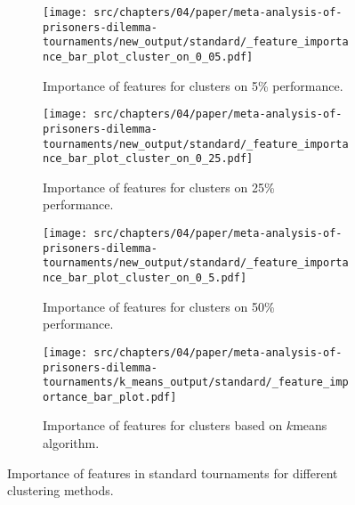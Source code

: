 \begin{figure}[!htbp]
    \begin{subfigure}[t]{0.5\textwidth}
        \begin{center}
            \texttt{[image: src/chapters/04/paper/meta-analysis-of-prisoners-dilemma-tournaments/new\_output/standard/\_feature\_importance\_bar\_plot\_cluster\_on\_0\_05.pdf]}
        \end{center}
        \caption{Importance of features for clusters on 5\% performance.}
    \end{subfigure}\hfill
    \begin{subfigure}[t]{0.5\textwidth}
        \begin{center}
            \texttt{[image: src/chapters/04/paper/meta-analysis-of-prisoners-dilemma-tournaments/new\_output/standard/\_feature\_importance\_bar\_plot\_cluster\_on\_0\_25.pdf]}
        \end{center}
        \caption{Importance of features for clusters on 25\% performance.}
    \end{subfigure}
    \begin{subfigure}[t]{0.5\textwidth}
        \begin{center}
            \texttt{[image: src/chapters/04/paper/meta-analysis-of-prisoners-dilemma-tournaments/new\_output/standard/\_feature\_importance\_bar\_plot\_cluster\_on\_0\_5.pdf]}
        \end{center}
        \caption{Importance of features for clusters on 50\% performance.}
    \end{subfigure}\hfill
    \begin{subfigure}[t]{0.5\textwidth}
        \begin{center}
            \texttt{[image: src/chapters/04/paper/meta-analysis-of-prisoners-dilemma-tournaments/k\_means\_output/standard/\_feature\_importance\_bar\_plot.pdf]}
        \end{center}
        \caption{Importance of features for clusters based on \(k\)means algorithm.}
    \end{subfigure}
    \caption{Importance of features in standard tournaments for different
    clustering methods.}\label{fig:clustering_importance_standard}
\end{figure}

